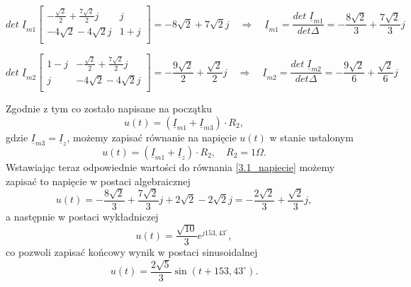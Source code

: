 \documentclass[12pt, a4paper]{article}
\begin{document}
\begin{equation*}
  det\; \underline{I}_{m1}
  \begin{bmatrix}
    -\frac{\sqrt{2}}{2}+\frac{7\sqrt{2}}{2}j & j   \\
    -4\sqrt{2}-4\sqrt{2}j                    & 1+j \\
  \end{bmatrix}
  = -8\sqrt{2} + 7\sqrt{2}j
  \quad \Rightarrow \quad
  \underline{I}_{m1} = \frac{det\; \underline{I}_{m1}}{det\Delta} =
  -\frac{8\sqrt{2}}{3}+\frac{7\sqrt{2}}{3}j
\end{equation*}

\begin{equation*}
  det\; \underline{I}_{m2}
  \begin{bmatrix}
    1-j & -\frac{\sqrt{2}}{2}+\frac{7\sqrt{2}}{2}j \\
    j   & -4\sqrt{2}-4\sqrt{2}j                    \\
  \end{bmatrix}
  = -\frac{9\sqrt{2}}{2}+\frac{\sqrt{2}}{2}j
  \quad \Rightarrow \quad
  \underline{I}_{m2} = \frac{det\; \underline{I}_{m2}}{det\Delta}
  = -\frac{9\sqrt{2}}{6}+\frac{\sqrt{2}}{6}j
\end{equation*}


Zgodnie z tym co zostało napisane na początku
\begin{equation*}
  u(t) = \left(\underline{I}_{m1}+\underline{I}_{m3}\right)\cdot R_2,
\end{equation*}
gdzie $\underline{I}_{m3} = \underline{I}_z$, możemy zapisać równanie na napięcie $u(t)$
w stanie ustalonym
\begin{equation}\label{3.1_napiecie}
  u(t) = \left(\underline{I}_{m1}+\underline{I}_z\right)\cdot R_2, \quad R_2 = 1\Omega.
\end{equation}
Wstawiając teraz odpowiednie wartości do równania \ref{3.1_napiecie} możemy zapisać
to napięcie w postaci algebraicznej
\begin{equation*}
  u(t) = -\frac{8\sqrt{2}}{3}+\frac{7\sqrt{2}}{3}j + 2\sqrt{2}-2\sqrt{2}j =
  -\frac{2\sqrt{2}}{3}+\frac{\sqrt{2}}{3}j,
\end{equation*}
a następnie w postaci wykładniczej
\begin{equation*}
  u(t) = \frac{\sqrt{10}}{3}e^{j153,43^\circ},
\end{equation*}
co pozwoli zapisać końcowy wynik w postaci sinusoidalnej
\begin{equation*}
  u(t) = \frac{2\sqrt{5}}{3}\sin(t+153,43^\circ).
\end{equation*}
\end{document}
